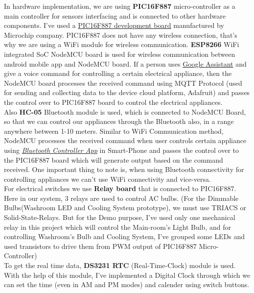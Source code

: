 \documentclass[11pt,a4paper]{article}
\begin{document}
\newpage

In hardware implementation, we are using \textbf{PIC16F887} micro-controller as a main controller for sensors interfacing and is connected to other hardware components. I've used a \uline{PIC16F887 development board} manufactured by Microchip company. PIC16F887 does not have any wireless connection, that's why we are using a WiFi module for wireless communication. \textbf{ESP8266} WiFi integrated SoC NodeMCU board is
used for wireless communication between android mobile app and NodeMCU board. If a person uses \uline{Google Assistant} and give a voice command for controlling a certain electrical appliance, then  the NodeMCU board processes the received command using MQTT Protocol (used for sending and collecting data to the device cloud platform, Adafruit) and passes the control over to PIC16F887 board to control the electrical appliances.\\

Also \textbf{HC-05} Bluetooth module is used, which is connected to NodeMCU Board, so that we can control our appliances through the Bluetooth also, in a range anywhere between 1-10 meters. Similar to WiFi Communication method, NodeMCU processes the received command when user controls certain appliance using \textit{\uline{Bluetooth Controller App}} in Smart-Phone and passes the control over to the PIC16F887 board which will generate output based on the command received. One important thing to note is, when using Bluetooth connectivity for controlling appliances we can't use WiFi connectivity and vice-versa.\\ 

For electrical switches we use \textbf{Relay board} that is connected to PIC16F887. Here in our system, 3 relays are used to control AC bulbs. (For the Dimmable Bulbs(Washroom LED and Cooling System prototype), we must use TRIACS or Solid-State-Relays. But for the Demo purpose, I've used only one mechanical relay in this project which will control the Main-room's Light Bulb, and for controlling Washroom's Bulb and Cooling System, I've grouped some LEDs and used transistors to drive them from PWM output of PIC16F887 Micro-Controller)\\

To get the real time data, \textbf{DS3231 RTC} (Real-Time-Clock) module is used. With the help of this module, I've implemented a Digital Clock through which we can set the time (even in AM and PM modes) and calender using switch buttons.\\
\end{document}
